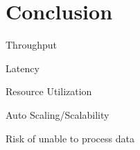 \section{Conclusion}

Throughput

Latency

Resource Utilization

Auto Scaling/Scalability

Risk of unable to process data
